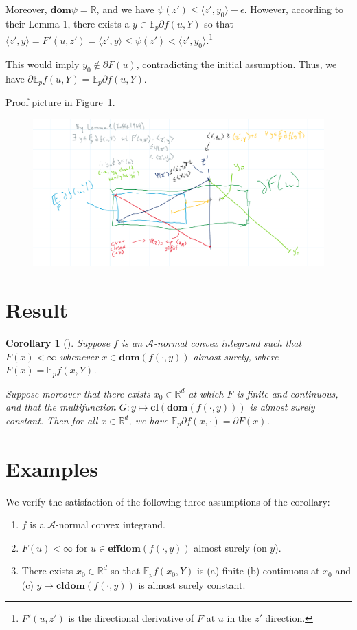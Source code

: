 \documentclass[12pt]{article}
\newcommand{\reals}{\mathbb{R}}
\newcommand{\A}{\mathcal{A}}
\newcommand{\E}{\mathbb{E}}
\newcommand{\cl}{\mathbf{cl}}
\newcommand{\dom}{\mathbf{dom}}
\newcommand{\effdom}{\mathbf{effdom}}
\newtheorem{corollary}{Corollary}
\begin{document}
Moreover, $\dom \psi = \reals$, and we have $\psi(z') \leq \langle z', y_0 \rangle - \epsilon$.
However, according to their Lemma 1, there exists a $y \in \E_p \partial f(u,Y)$ so that $\langle z', y \rangle = F'(u,z') = \langle z', y \rangle \leq \psi(z') < \langle z', y_0 \rangle$.\footnote{$F'(u,z')$ is the directional derivative of $F$ at $u$ in the $z'$ direction.}

This would imply $y_0 \not \in \partial F(u)$, contradicting the initial assumption.
Thus, we have $\partial \E_p f(u,Y) = \E_p \partial f(u,Y)$. 

Proof picture in Figure~\ref{fig:ioffeproofpic}.
\begin{figure}
	\centering
	\includegraphics[width=0.7\linewidth]{tikz/ioffeproofpic}
	\caption[Picture understanding proof of Ioffe result]{}
	\label{fig:ioffeproofpic}
\end{figure}



\section{Result}
\begin{corollary}[\cite{rockafellar1982interchange}]
	Suppose $f$ is an $\A$-normal convex integrand such that $F(x) < \infty$ whenever $x \in \dom(f(\cdot,y))$ almost surely, where $F(x) = \E_p f(x,Y)$.
	
	Suppose moreover that there exists $x_0 \in \reals^d$ at which $F$ is finite and continuous, and that the multifunction $G: y \mapsto \cl(\dom(f(\cdot,y)))$ is almost surely constant.
	Then for all $x \in \reals^d$, we have $\E_p \partial f(x, \cdot) = \partial F(x)$.
\end{corollary}


\section{Examples}
We verify the satisfaction of the following three assumptions of the corollary:
\begin{enumerate}
	\item $f$ is a $\A$-normal convex integrand.
	\item $F(u) < \infty$ for $u \in \effdom(f(\cdot,y))$ almost surely (on $y$).
	\item There exists $x_0 \in \reals^d$ so that $\E_p f(x_0, Y)$ is (a) finite (b) continuous at $x_0$ and (c) $y \mapsto \cl \dom (f(\cdot, y))$ is almost surely constant.
\end{enumerate}
\end{document}
